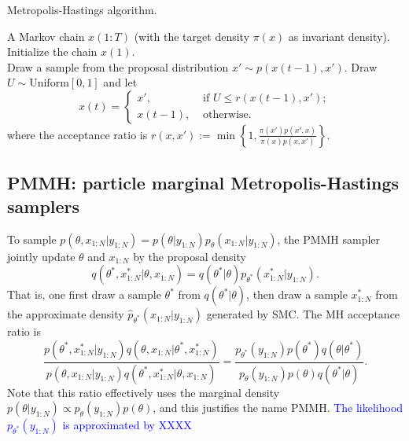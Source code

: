 \documentclass[12pt]{article}
\newcommand{\fblue}[1]{\textcolor{blue}{{#1}}}
\def\phat{\widehat{p}}
\begin{document}
 \begin{algorithm} %
\caption{Metropolis-Hastings algorithm. } %
\label{alg:MH} %
\begin{algorithmic}%
    \ENSURE A Markov chain $x(1:T)$ (with the target density $\pi(x)$ as invariant density). 
    \STATE  Initialize the chain $x(1)$. \\ 
            \STATE Draw a sample from the proposal distribution $x'\sim p(x(t-1),x')$. 
            \STATE Draw $U\sim \mathrm{ Uniform[0,1]}$ and let 
                    \[
                      x(t) = \left\{ 
                        \begin{array}{ll}
                            x',         & \textrm{ if } U\leq r(x(t-1),x');  \\
                            x(t-1),  & \textrm{ otherwise}.      
                        \end{array} \right.    
                  \]  
                  where the acceptance ratio is  $r(x,x'):= \min\left\{1, \frac{\pi(x')p(x',x)}{\pi(x) p(x,x')}\right\}$.  
    \ENDFOR
\end{algorithmic}
\end{algorithm}


\subsection{PMMH: particle marginal Metropolis-Hastings samplers} \label{sec-pmmh}
To sample $p(\theta, x_{1:N} | y_{1:N})=p(\theta | y_{1:N})p_\theta(x_{1:N} | y_{1:N})$, the PMMH sampler jointly update $\theta$ and $x_{1:N}$ by the proposal density 
\[
q(\theta^*, x^*_{1:N} | \theta, x_{1:N} ) = q(\theta^*|\theta) p_{\theta^*}(x^*_{1:N} | y_{1:N}). 
\]
That is, one first draw a sample $\theta^*$ from $q(\theta^*|\theta)$, then draw a sample $x^*_{1:N}$ from the approximate density  $\phat_{\theta^*}(x_{1:N} | y_{1:N})$ generated by SMC.  The MH acceptance ratio is 
\[
\frac{p(\theta^*, x^*_{1:N} | y_{1:N} )  q( \theta, x_{1:N}|\theta^*, x^*_{1:N} ) }{p(\theta, x_{1:N} | y_{1:N} )  q(\theta^*, x^*_{1:N} | \theta, x_{1:N} ) } = \frac{p_{\theta^*}( y_{1:N} ) p(\theta^*) q(\theta | \theta^*) }{p_\theta ( y_{1:N} ) p(\theta) q(\theta^*|\theta) }.
\]
 Note that this ratio effectively uses the marginal density $p(\theta| y_{1:N}) \propto p_\theta(y_{1:N}) p(\theta)$, and this justifies the name PMMH. \fblue{The likelihood $p_{\theta^*}( y_{1:N})$ is approximated by  XXXX} 
\end{document}
